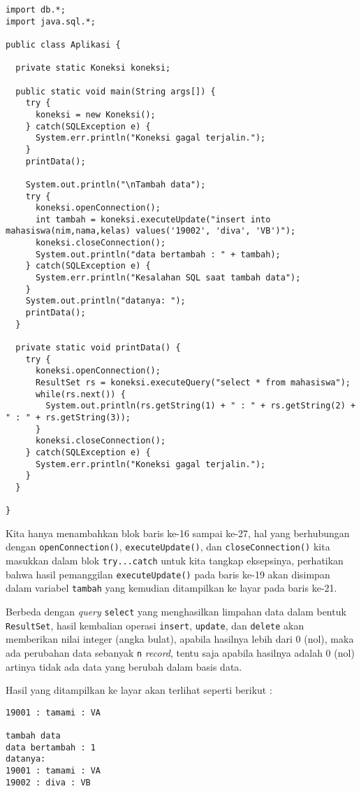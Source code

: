 \begin{lstlisting}
import db.*;
import java.sql.*;

public class Aplikasi {

  private static Koneksi koneksi;
  
  public static void main(String args[]) {
    try {
      koneksi = new Koneksi();
    } catch(SQLException e) {
      System.err.println("Koneksi gagal terjalin.");
    }
    printData();
    
    System.out.println("\nTambah data");
    try {
      koneksi.openConnection();
      int tambah = koneksi.executeUpdate("insert into mahasiswa(nim,nama,kelas) values('19002', 'diva', 'VB')");
      koneksi.closeConnection();
      System.out.println("data bertambah : " + tambah);
    } catch(SQLException e) {
      System.err.println("Kesalahan SQL saat tambah data");
    }
    System.out.println("datanya: ");
    printData();
  }
  
  private static void printData() {
    try {
      koneksi.openConnection();
      ResultSet rs = koneksi.executeQuery("select * from mahasiswa");
      while(rs.next()) {
        System.out.println(rs.getString(1) + " : " + rs.getString(2) + " : " + rs.getString(3));
      }
      koneksi.closeConnection();
    } catch(SQLException e) {
      System.err.println("Koneksi gagal terjalin.");
    }
  }
  
}
\end{lstlisting}

Kita hanya menambahkan blok baris ke-16 sampai ke-27, hal yang berhubungan dengan \texttt{openConnection()}, \texttt{executeUpdate()}, dan \texttt{closeConnection()} kita masukkan dalam blok \texttt{try...catch} untuk kita tangkap eksepsinya, perhatikan bahwa hasil pemanggilan \texttt{executeUpdate()} pada baris ke-19 akan disimpan dalam variabel \texttt{tambah} yang kemudian ditampilkan ke layar pada baris ke-21.

Berbeda dengan \textit{query} \texttt{select} yang menghasilkan limpahan data dalam bentuk \texttt{ResultSet}, hasil kembalian operasi \texttt{insert}, \texttt{update}, dan \texttt{delete} akan memberikan nilai integer (angka bulat), apabila hasilnya lebih dari 0 (nol), maka ada perubahan data sebanyak \texttt{n} \textit{record}, tentu saja apabila hasilnya adalah 0 (nol) artinya tidak ada data yang berubah dalam basis data.

Hasil yang ditampilkan ke layar akan terlihat seperti berikut :

\begin{lstlisting}
19001 : tamami : VA

tambah data
data bertambah : 1
datanya:
19001 : tamami : VA
19002 : diva : VB
\end{lstlisting}

